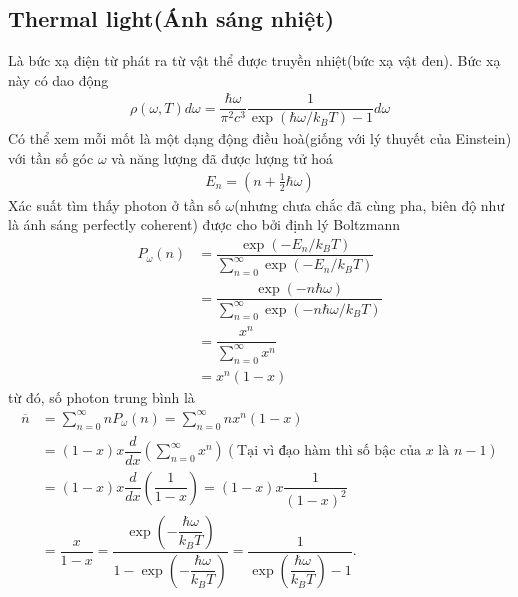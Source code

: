 \documentclass{report}
\newcommand{\f}[2]{\dfrac{#1}{#2}}
\begin{document}
\subsection{Thermal light(Ánh sáng nhiệt)}
Là bức xạ điện từ phát ra từ vật thể được truyền nhiệt(bức xạ vật đen). Bức xạ này có dao động
\begin{gather}
	\rho(\omega, T) d\omega = \f{\hbar \omega}{\pi^{2} c^{3}} \f{1}{\exp(\hbar \omega / k_{B} T) - 1} d\omega
\end{gather}
Có thể xem mỗi mốt là một dạng động điều hoà(giống với lý thuyết của Einstein) với tần số góc $\omega$ và năng lượng đã được lượng tử hoá
\begin{gather}
	E_{n} = (n + \frac{1}{2} \hbar \omega)
\end{gather}
Xác suất tìm thấy photon ở tần số $\omega$(nhưng chưa chắc đã cùng pha, biên độ như là ánh sáng perfectly coherent) được cho bởi định lý Boltzmann
\begin{equation}
	\begin{aligned}
		P_{\omega}(n)
		 & = \f{\exp(-E_{n} / k_{B} T)}{\sum_{n = 0}^{\infty} \exp(-E_{n} / k_{B} T)}      \\
		 & = \f{\exp(-n\hbar \omega)}{\sum_{n = 0}^{\infty} \exp(-n\hbar\omega / k_{B} T)} \\
		 & = \f{x^{n}}{\sum_{n = 0}^{\infty} x^{n}}                                        \\
		 & = x^{n}(1-x)
	\end{aligned}
\end{equation}
từ đó, số photon trung bình là
\begin{equation}
	\begin{aligned}
		\overline{n}
		 & = \sum_{n = 0}^{\infty} n P_{\omega}(n)                                                                              = \sum_{n = 0}^{\infty} n x^{n} (1-x)                                                                                  \\
		 & = (1 - x) x \f{d}{dx} \left( \sum_{n = 0}^{\infty} x^{n} \right) (\text{Tại vì đạo hàm thì số bậc của $x$ là $n - 1$}) \\
		 & = (1 - x) x \f{d}{dx} \left(\f{1}{1 - x}\right)                                                                      
		 = (1 - x) x \f{1}{(1 - x)^2}                                                                                           \\
		 & = \f{x}{1 - x}                                                                                                         = \f{\exp(-\f{\hbar \omega}{k_B T})}{1 - \exp(-\f{\hbar \omega}{k_B T})} = \f{1}{\exp(\f{\hbar \omega}{k_B T}) - 1} .
	\end{aligned}
\end{equation}
\end{document}
